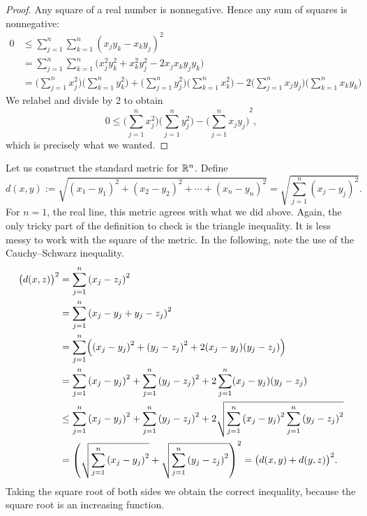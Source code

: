 \begin{proof}
Any square of a real number is nonnegative.  Hence any sum of squares is
nonnegative:
\begin{equation*}
\begin{split}
0 & \leq 
\sum_{j=1}^n \sum_{k=1}^n {(x_j y_k - x_k y_j)}^2
\\
& =
\sum_{j=1}^n \sum_{k=1}^n \bigl( x_j^2 y_k^2 + x_k^2 y_j^2 - 2 x_j x_k y_j
y_k \bigr)
\\
& =
\biggl( \sum_{j=1}^n x_j^2 \biggr)
\biggl( \sum_{k=1}^n y_k^2 \biggr)
+
\biggl( \sum_{j=1}^n y_j^2 \biggr)
\biggl( \sum_{k=1}^n x_k^2 \biggr)
-
2
\biggl( \sum_{j=1}^n x_j y_j \biggr)
\biggl( \sum_{k=1}^n x_k y_k \biggr)
\end{split}
\end{equation*}
We relabel and divide by 2 to obtain
\begin{equation*}
0 \leq 
\biggl( \sum_{j=1}^n x_j^2 \biggr)
\biggl( \sum_{j=1}^n y_j^2 \biggr)
-
{\biggl( \sum_{j=1}^n x_j y_j \biggr)}^2 ,
\end{equation*}
which is precisely what we wanted.
\end{proof}

\begin{example}
Let us construct the
standard metric for ${\mathbb{R}}^n$.  Define
\begin{equation*}
d(x,y) :=
\sqrt{
{(x_1-y_1)}^2 + 
{(x_2-y_2)}^2 + 
\cdots +
{(x_n-y_n)}^2
} =
\sqrt{
\sum_{j=1}^n
{(x_j-y_j)}^2 
} .
\end{equation*}
For $n=1$, the real line, this metric agrees with what we did above.  Again,
the only tricky part of the definition to check is the triangle inequality.
It is less messy to work with the square of the metric.  In the
following, note the use of the Cauchy--Schwarz inequality.
\begin{equation*}
\begin{split}
{\bigl(d(x,z)\bigr)}^2 & =
\sum_{j=1}^n
{(x_j-z_j)}^2 
\\
& =
\sum_{j=1}^n
{(x_j-y_j+y_j-z_j)}^2 
\\
& =
\sum_{j=1}^n
\Bigl(
{(x_j-y_j)}^2+{(y_j-z_j)}^2 + 2(x_j-y_j)(y_j-z_j)
\Bigr)
\\
& =
\sum_{j=1}^n
{(x_j-y_j)}^2
+
\sum_{j=1}^n
{(y_j-z_j)}^2 
+
2
\sum_{j=1}^n
(x_j-y_j)(y_j-z_j)
\\
& \leq
\sum_{j=1}^n
{(x_j-y_j)}^2
+
\sum_{j=1}^n
{(y_j-z_j)}^2 
+
2
\sqrt{
\sum_{j=1}^n
{(x_j-y_j)}^2
\sum_{j=1}^n
{(y_j-z_j)}^2
}
\\
& =
{\left(
\sqrt{
\sum_{j=1}^n
{(x_j-y_j)}^2
}
+
\sqrt{
\sum_{j=1}^n
{(y_j-z_j)}^2 
}
\right)}^2
=
{\bigl( d(x,y) + d(y,z) \bigr)}^2 .
\end{split}
\end{equation*}
Taking the square root of both sides we obtain the correct inequality,
because the square root is an increasing function.
\end{example}

